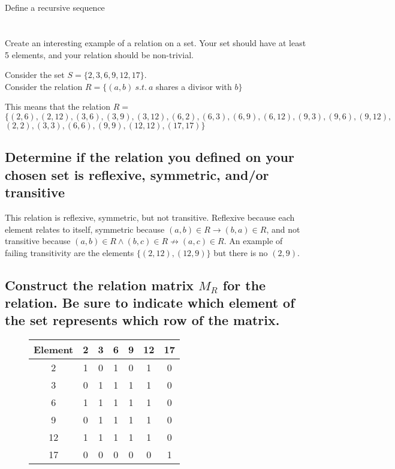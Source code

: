 \documentclass{article}
\newcommand{\YearPath}{../../../LatexConfig} %
\newcommand{\SemesterPath}{../../LatexConfig} %
\newcommand{\ClassPath}{../LatexConfig} %
\begin{document}




\section{} %
Define a recursive sequence \\


\newpage
\section{} %
Create an interesting example of a relation on a set. Your set should have at least 5 elements, and your relation should be non-trivial.

Consider the set $S=\{2, 3, 6, 9, 12, 17\}$.\\
Consider the relation $R=\{(a,b) ~s.t.~ a$ shares a divisor with $b\}$

This means that the relation $R=$\\
$\{(2,6), (2,12), (3,6), (3,9), (3,12), (6,2), (6,3), (6,9), (6,12), (9,3), (9,6), (9,12),$\\
$(2,2), (3,3), (6,6), (9,9), (12,12), (17, 17)\}$

\subsection{Determine if the relation you defined on your chosen set is reflexive, symmetric, and/or transitive}
This relation is reflexive, symmetric, but not transitive. Reflexive because each element relates to itself, symmetric because $(a,b) \in R \rightarrow (b,a) \in R$, and not transitive because $(a,b) \in R \land (b,c) \in R \not \rightarrow (a,c) \in R$. An example of failing transitivity are the elements $\{(2,12), (12,9)\}$ but there is no $(2,9)$.

\subsection{Construct the relation matrix $M_R$ for the relation. Be sure to indicate which element of the set
represents which row of the matrix.}
\begin{figure}[H]
\centering
\begin{tabular}{|c|cccccc|}
\hline
Element & 2 & 3 & 6 & 9 & 12 & 17 \\
\hline
2 & 1 & 0 & 1 & 0 & 1 & 0 \\
3 & 0 & 1 & 1 & 1 & 1 & 0 \\
6 & 1 & 1 & 1 & 1 & 1 & 0 \\
9 & 0 & 1 & 1 & 1 & 1 & 0 \\
12 & 1 & 1 & 1 & 1 & 1 & 0 \\
17 & 0 & 0 & 0 & 0 & 0 & 1 \\
\hline
\end{tabular}
\end{figure}
\end{document}
